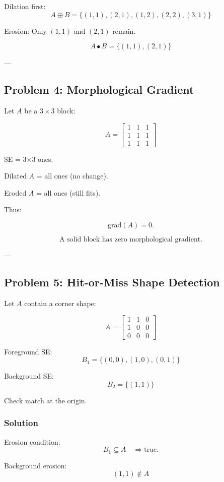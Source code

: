 \documentclass{AnantDocumentation}
\begin{document}
Dilation first:
\[
A \oplus B = \{(1,1),(2,1),(1,2),(2,2),(3,1)\}
\]

Erosion:
Only $(1,1)$ and $(2,1)$ remain.

\[
\boxed{A \bullet B = \{(1,1),(2,1)\}}
\]

---

\subsection*{Problem 4: Morphological Gradient}

Let $A$ be a $3\times3$ block:

\[
A =
\begin{bmatrix}
1 &1 &1 \\
1 &1 &1 \\
1 &1 &1
\end{bmatrix}
\]

SE = 3×3 ones.

Dilated $A$ = all ones (no change).

Eroded $A$ = all ones (still fits).

Thus:

\[
\text{grad}(A)=0.
\]

\[
\boxed{\text{A solid block has zero morphological gradient.}}
\]

---

\subsection*{Problem 5: Hit-or-Miss Shape Detection}

Let $A$ contain a corner shape:

\[
A =
\begin{bmatrix}
1 &1 &0 \\
1 &0 &0 \\
0 &0 &0 
\end{bmatrix}
\]

Foreground SE:
\[
B_1=\{(0,0),(1,0),(0,1)\}
\]

Background SE:
\[
B_2=\{(1,1)\}
\]

Check match at the origin.

\subsubsection*{Solution}

Erosion condition:
\[
B_{1} \subseteq A \quad \Rightarrow \text{true.}
\]

Background erosion:
\[
(1,1) \notin A
\]
\end{document}

